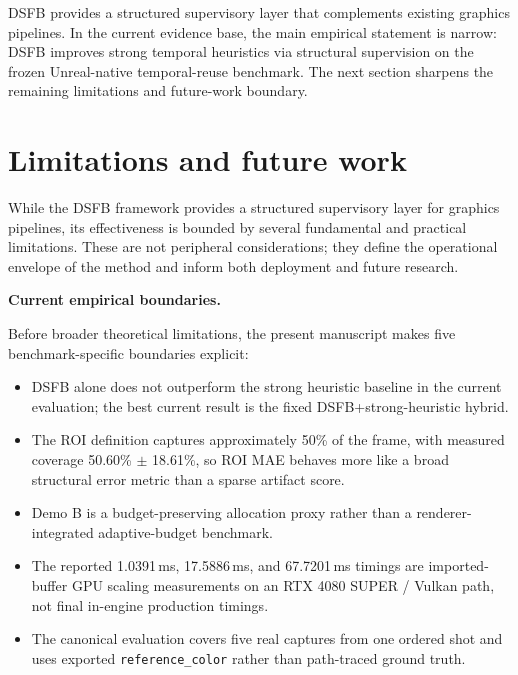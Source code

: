 \documentclass[11pt]{article}
\theoremstyle{definition}
\theoremstyle{plain}
\begin{document}
DSFB provides a structured supervisory layer that complements existing graphics pipelines. In the current evidence base, the main empirical statement is narrow: DSFB improves strong temporal heuristics via structural supervision on the frozen Unreal-native temporal-reuse benchmark. The next section sharpens the remaining limitations and future-work boundary.


\section{Limitations and future work}

While the DSFB framework provides a structured supervisory layer for graphics pipelines, its effectiveness is bounded by several fundamental and practical limitations. These are not peripheral considerations; they define the operational envelope of the method and inform both deployment and future research.

\vspace{0.5em}
\noindent
\textbf{Current empirical boundaries.}

Before broader theoretical limitations, the present manuscript makes five benchmark-specific boundaries explicit:
\begin{itemize}[leftmargin=1.5em]
    \item DSFB alone does not outperform the strong heuristic baseline in the current evaluation; the best current result is the fixed DSFB+strong-heuristic hybrid.
    \item The ROI definition captures approximately 50\% of the frame, with measured coverage 50.60\% $\pm$ 18.61\%, so ROI MAE behaves more like a broad structural error metric than a sparse artifact score.
    \item Demo B is a budget-preserving allocation proxy rather than a renderer-integrated adaptive-budget benchmark.
    \item The reported 1.0391\,ms, 17.5886\,ms, and 67.7201\,ms timings are imported-buffer GPU scaling measurements on an RTX 4080 SUPER / Vulkan path, not final in-engine production timings.
    \item The canonical evaluation covers five real captures from one ordered shot and uses exported \texttt{reference\_color} rather than path-traced ground truth.
\end{itemize}
\end{document}
